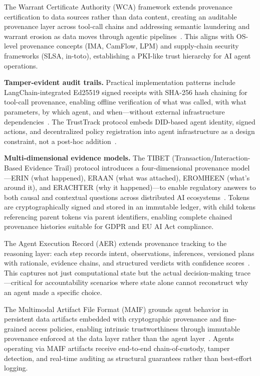 The Warrant Certificate Authority (WCA) framework extends provenance certification to data sources rather than data content, creating an auditable provenance layer across tool-call chains and addressing semantic laundering and warrant erosion as data moves through agentic pipelines~\cite{wca2025}. This aligns with OS-level provenance concepts (IMA, CamFlow, LPM) and supply-chain security frameworks (SLSA, in-toto), establishing a PKI-like trust hierarchy for AI agent operations.

\textbf{Tamper-evident audit trails.} Practical implementation patterns include LangChain-integrated Ed25519 signed receipts with SHA-256 hash chaining for tool-call provenance, enabling offline verification of what was called, with what parameters, by which agent, and when---without external infrastructure dependencies~\cite{langchainaudit2025}. The TrustTrack protocol embeds DID-based agent identity, signed actions, and decentralized policy registration into agent infrastructure as a design constraint, not a post-hoc addition~\cite{trusttrack2025}.

\textbf{Multi-dimensional evidence models.} The TIBET (Transaction/Interaction-Based Evidence Trail) protocol introduces a four-dimensional provenance model---ERIN (what happened), ERAAN (what was attached), EROMHEEN (what's around it), and ERACHTER (why it happened)---to enable regulatory answers to both causal and contextual questions across distributed AI ecosystems~\cite{tibet2026}. Tokens are cryptographically signed and stored in an immutable ledger, with child tokens referencing parent tokens via parent identifiers, enabling complete chained provenance histories suitable for GDPR and EU AI Act compliance.

The Agent Execution Record (AER) extends provenance tracking to the reasoning layer: each step records intent, observations, inferences, versioned plans with rationale, evidence chains, and structured verdicts with confidence scores~\cite{aer2025}. This captures not just computational state but the actual decision-making trace---critical for accountability scenarios where state alone cannot reconstruct why an agent made a specific choice.

The Multimodal Artifact File Format (MAIF) grounds agent behavior in persistent data artifacts embedded with cryptographic provenance and fine-grained access policies, enabling intrinsic trustworthiness through immutable provenance enforced at the data layer rather than the agent layer~\cite{maif2025}. Agents operating via MAIF artifacts receive end-to-end chain-of-custody, tamper detection, and real-time auditing as structural guarantees rather than best-effort logging.

